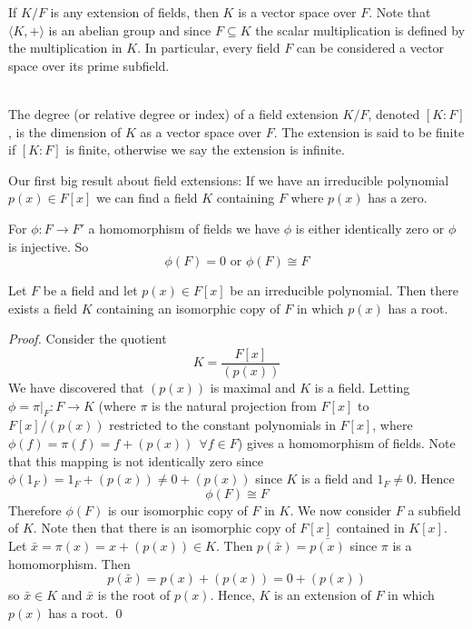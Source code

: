 If $K/F$ is any extension of fields, then $K$ is a vector space over $F$. Note that $\langle K, + \rangle$ is an abelian group and since $F\subseteq K$ the scalar multiplication is defined by the multiplication in $K$. In particular, every field $F$ can be considered a vector space over its prime subfield.

\begin{definition} \leavevmode \\
    The degree (or relative degree or index) of a field extension $K/F$, denoted $[K:F]$, is the dimension of $K$ as a vector space over $F$. The extension is said to be finite if $[K:F]$ is finite, otherwise we say the extension is infinite.
\end{definition}

Our first big result about field extensions: If we have an irreducible polynomial $p(x) \in F[x]$ we can find a field $K$ containing $F$ where $p(x)$ has a zero.

\begin{recall}
    For $\phi:F \to F'$ a homomorphism of fields we have $\phi$ is either identically zero or $\phi$ is injective. So
    $$\phi(F) = 0 \text{ or } \phi(F) \cong F$$
\end{recall}

\begin{proposition}
    Let $F$ be a field and let $p(x) \in F[x]$ be an irreducible polynomial. Then there exists a field $K$ containing an isomorphic copy of $F$ in which $p(x)$ has a root.
\end{proposition}

\begin{proof}
    Consider the quotient
    $$K = \frac{F[x]}{\left(p(x)\right)}$$
    We have discovered that $\left(p(x)\right)$ is maximal and $K$ is a field. Letting $\phi = \pi \vert_F : F \to K$ (where $\pi$ is the natural projection from $F[x]$ to $F[x]/\left(p(x)\right)$ restricted to the constant polynomials in $F[x]$, where $\phi(f) = \pi(f) = f + \left(p(x)\right) ~~\forall f \in F$) gives a homomorphism of fields. Note that this mapping is not identically zero since $\phi(1_F) = 1_F + \left(p(x)\right) \neq 0 + \left(p(x)\right)$ since $K$ is a field and $1_F \neq 0$. Hence
    $$\phi(F) \cong F$$
    Therefore $\phi(F)$ is our isomorphic copy of $F$ in $K$. We now consider $F$ a subfield of $K$. Note then that there is an isomorphic copy of $F[x]$ contained in $K[x]$. Let $\bar{x} = \pi(x) = x+\left(p(x)\right) \in K$. Then $p(\bar{x}) = \bar{p(x)}$ since $\pi$ is a homomorphism. Then
    $$p(\bar{x}) = p(x) + \left(p(x)\right) = 0 + \left(p(x)\right)$$
    so $\bar{x} \in K$ and $\bar{x}$ is the root of $p(x)$. Hence, $K$ is an extension of $F$ in which $p(x)$ has a root.
    \qed
\end{proof}

